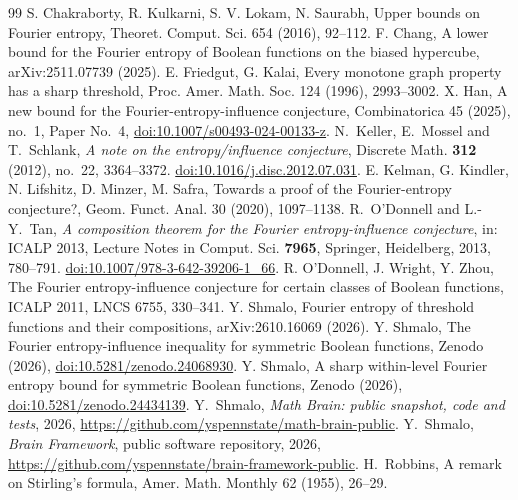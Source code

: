 \documentclass[11pt]{amsart}
\theoremstyle{remark}
\begin{document}
\begin{thebibliography}{99}
 S. Chakraborty, R. Kulkarni, S. V. Lokam, N. Saurabh, Upper bounds on Fourier entropy, Theoret. Comput. Sci. 654 (2016), 92--112.
 F. Chang, A lower bound for the Fourier entropy of Boolean functions on the biased hypercube, arXiv:2511.07739 (2025).
 E. Friedgut, G. Kalai, Every monotone graph property has a sharp threshold, Proc. Amer. Math. Soc. 124 (1996), 2993--3002.
 X. Han, A new bound for the Fourier-entropy-influence conjecture, Combinatorica 45 (2025), no.~1, Paper No.~4, \href{https://doi.org/10.1007/s00493-024-00133-z}{doi:10.1007/s00493-024-00133-z}.
N.~Keller, E.~Mossel and T.~Schlank,
\emph{A note on the entropy/influence conjecture},
Discrete Math. \textbf{312} (2012), no.~22, 3364--3372.
\href{https://doi.org/10.1016/j.disc.2012.07.031}{doi:10.1016/j.disc.2012.07.031}.
 E. Kelman, G. Kindler, N. Lifshitz, D. Minzer, M. Safra, Towards a proof of the Fourier-entropy conjecture?, Geom. Funct. Anal. 30 (2020), 1097--1138.
R.~O'Donnell and L.-Y.~Tan,
\emph{A composition theorem for the Fourier entropy-influence conjecture},
in: ICALP 2013, Lecture Notes in Comput. Sci. \textbf{7965}, Springer, Heidelberg, 2013, 780--791.
\href{https://doi.org/10.1007/978-3-642-39206-1_66}{doi:10.1007/978-3-642-39206-1\_66}.
 R. O'Donnell, J. Wright, Y. Zhou, The Fourier entropy-influence conjecture for certain classes of Boolean functions, ICALP 2011, LNCS 6755, 330--341.
 Y. Shmalo, Fourier entropy of threshold functions and their compositions, arXiv:2610.16069 (2026).
 Y. Shmalo, The Fourier entropy-influence inequality for symmetric Boolean functions, Zenodo (2026), \href{https://doi.org/10.5281/zenodo.24068930}{doi:10.5281/zenodo.24068930}.
 Y. Shmalo, A sharp within-level Fourier entropy bound for symmetric Boolean functions, Zenodo (2026), \href{https://doi.org/10.5281/zenodo.24434139}{doi:10.5281/zenodo.24434139}.
 Y.~Shmalo, \emph{Math Brain: public snapshot, code and tests}, 2026, \url{https://github.com/yspennstate/math-brain-public}.
 Y.~Shmalo, \emph{Brain Framework}, public software repository, 2026, \url{https://github.com/yspennstate/brain-framework-public}.
 H.~Robbins, A remark on Stirling's formula, Amer. Math. Monthly 62 (1955), 26--29.
\end{thebibliography}
\end{document}
